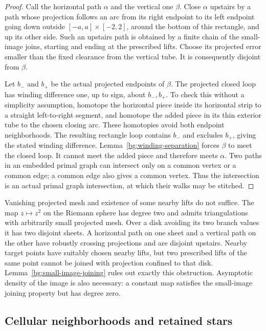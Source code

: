 \begin{proof}
Call the horizontal path $\alpha$ and the vertical one $\beta$.
Close $\alpha$ upstairs by a path whose projection follows an arc
from its right endpoint to its left endpoint going down outside
$[-a,a]\times[-2,2]$, around the bottom of this rectangle, and up
its other side. Such an upstairs path is obtained by a finite chain
of the small-image joins, starting and ending at the prescribed
lifts. Choose its projected error smaller than the fixed clearance
from the vertical tube. It is consequently disjoint from $\beta$.

Let $b_-$ and $b_+$ be the actual projected endpoints of $\beta$.
The projected closed loop has winding difference one, up to sign,
about $b_-,b_+$. To check this without a simplicity assumption,
homotope the horizontal piece inside its horizontal strip to a
straight left-to-right segment, and homotope the added piece in
its thin exterior tube to the chosen closing arc. These homotopies
avoid both endpoint neighborhoods. The resulting rectangle loop
contains $b_-$ and excludes $b_+$, giving the stated winding
difference. Lemma~\ref{bg:winding-separation} forces $\beta$ to
meet the closed loop. It cannot meet the added piece and therefore
meets $\alpha$. Two paths in an embedded primal graph can intersect
only on a common vertex or a common edge; a common edge also gives
a common vertex. Thus the intersection is an actual primal graph
intersection, at which their walks may be stitched.
\end{proof}

\begin{remark}
\label{bg:arbitrary-lifts-essential}
Vanishing projected mesh and existence of some nearby lifts do not
suffice. The map $z\mapsto z^2$ on the Riemann sphere has degree two
and admits triangulations with arbitrarily small projected mesh.
Over a disk avoiding its two branch values it has two disjoint
sheets. A horizontal path on one sheet and a vertical path on the
other have robustly crossing projections and are disjoint upstairs.
Nearby target points have suitably chosen nearby lifts, but two
prescribed lifts of the same point cannot be joined with projection
confined to that disk. Lemma~\ref{bg:small-image-joining} rules out
exactly this obstruction.
Asymptotic density of the image is also necessary: a constant map
satisfies the small-image joining property but has degree zero.
\end{remark}

\subsection{Cellular neighborhoods and retained stars}

